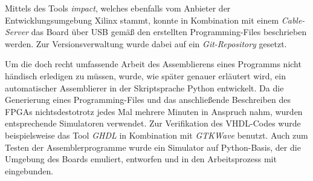 Mittels des Tools \textit{impact}, welches ebenfalls vom Anbieter der
Entwicklungsumgebung Xilinx stammt, konnte in Kombination mit einem
\textit{Cable-Server} das Board \"uber USB gem\"a{\ss} den erstellten
Programming-Files beschrieben werden. Zur Versionsverwaltung wurde dabei
auf ein \textit{Git-Repository} gesetzt.

Um die doch recht umfassende Arbeit des Assemblierens eines Programms nicht
h\"andisch erledigen zu m\"ussen, wurde, wie sp\"ater genauer erl\"autert wird,
ein automatischer Assemblierer in der Skriptsprache Python entwickelt. Da die
Generierung eines Programming-Files und das anschlie\ss{}ende Beschreiben des
FPGAs nichtsdestotrotz jedes Mal mehrere Minuten in Anspruch nahm,
wurden entsprechende Simulatoren verwendet. Zur Verifikation des VHDL-Codes
wurde beispielsweise das Tool \textit{GHDL} in Kombination mit \textit{GTKWave}
benutzt. Auch zum Testen der Assemblerprogramme wurde ein Simulator auf
Python-Basis, der die Umgebung des Boards emuliert, entworfen und in den
Arbeitsprozess mit eingebunden.

